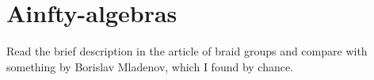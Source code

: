 
\section{Ainfty-algebras}

	Read the brief description in the article of braid groups and compare with
	something by Borislav Mladenov, which I found by chance.
